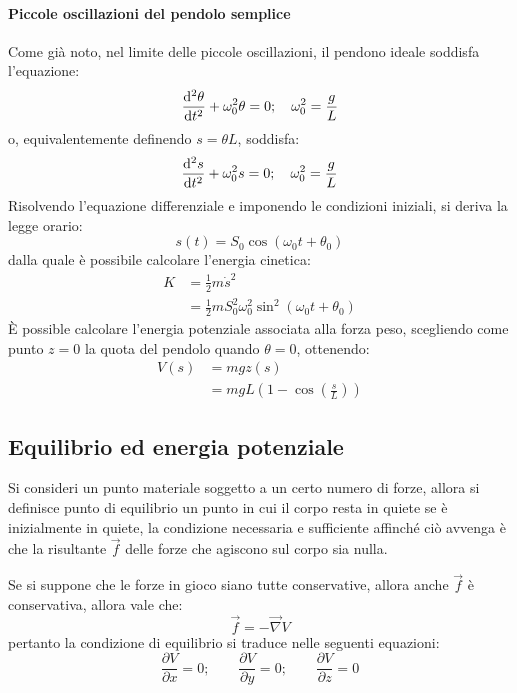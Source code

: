 \documentclass[11pt, a4paper, openright]{book}
\theoremstyle{plain}
\theoremstyle{definition}
\begin{document}
\paragraph{Piccole oscillazioni del pendolo semplice}
Come già noto, nel limite delle piccole oscillazioni, il pendono ideale soddisfa l'equazione:
\begin{equation}
    \dv[2]{\theta}{t} + \omega_0^2 \theta = 0; \quad \omega_0^2 = \frac{g}{L}
\end{equation}
o, equivalentemente definendo $s = \theta L$, soddisfa:
\begin{equation}
    \dv[2]{s}{t} + \omega_0^2 s = 0; \quad \omega_0^2 = \frac{g}{L}
\end{equation}
Risolvendo l'equazione differenziale e imponendo le condizioni iniziali, si deriva la legge orario:
\begin{equation}
    s(t) = S_0 \cos(\omega_0 t + \theta_0)
\end{equation}
dalla quale è possibile calcolare l'energia cinetica:
\begin{align}
    K & = \frac{1}{2}m\dot{s}^2 \\
      & = \frac{1}{2}m S_0^2 \omega_0^2 \sin^2(\omega_0 t + \theta_0)
\end{align}
È possible calcolare l'energia potenziale associata alla forza peso, scegliendo come punto $z = 0$ la quota del pendolo quando $\theta = 0$, ottenendo:
\begin{align}
    V(s) & = mgz(s) \\
         & = mgL(1 - \cos(\frac{s}{L}))
\end{align}
\newpage

\subsection{Equilibrio ed energia potenziale}
Si consideri un punto materiale soggetto a un certo numero di forze, allora si definisce punto di equilibrio un punto in cui il corpo resta in quiete se è inizialmente in quiete, la condizione necessaria e sufficiente affinché ciò avvenga è che la risultante $\vec{f}$ delle forze che agiscono sul corpo sia nulla.

Se si suppone che le forze in gioco siano tutte conservative, allora anche $\vec{f}$ è conservativa, allora vale che:
\[\vec{f} = -\vec{\nabla}V\]
pertanto la condizione di equilibrio si traduce nelle seguenti equazioni:
\[\frac{\partial V}{\partial x} = 0; \quad \quad \frac{\partial V}{\partial y} = 0; \quad \quad \frac{\partial V}{\partial z} = 0\]
\end{document}
